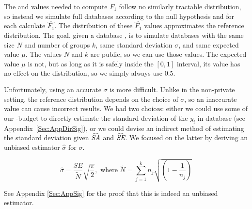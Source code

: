 The \sa and \se values needed to compute $F_1$ follow no similarly tractable distribution, so instead we simulate full databases according to the null hypothesis and for each calculate $\widehat{F_1}$.  The distribution of these $\widehat{F_1}$ values approximates the reference distribution.  The goal, given a database \x, is to simulate databases with the same size $N$ and number of groups $k$, same standard deviation $\sigma$, and same expected value $\mu$.  The values $N$ and $k$ are public, so we can use those values.  The expected value $\mu$ is not, but as long as it is safely inside the $[0,1]$ interval, its value has no effect on the distribution, so we simply always use 0.5. 




Unfortunately, using an accurate $\sigma$ is more difficult.  Unlike in the non-private setting, the reference distribution depends on the choice of $\sigma$, so an inaccurate value can cause incorrect results.  We had two choices: either we could use some of our \eps-budget to directly estimate the standard deviation of the $y_i$ in database \x (see Appendix~\ref{Sec:AppDirSig}), or we could devise an indirect method of estimating the standard deviation given $\widehat{\textit{SA}}$ and $\widehat{\textit{SE}}$. We focused on the latter by deriving an unbiased estimator $\hat{\sigma}$ for $\sigma$.

$$
\hat{\sigma} = \frac{\widehat{SE}}{\tilde{N}}\sqrt{\frac{\pi}{2}}, \text{ where } \tilde{N} = \sum_{j=1}^k n_j \sqrt{\left(1 - \frac{1}{n_j}\right)}
$$

See Appendix \ref{Sec:AppSig} for the proof that this is indeed an unbiased estimator.  

